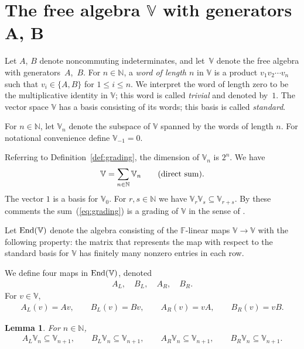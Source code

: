 \documentclass[pdftex]{sigma}
\numberwithin{equation}{section}
\newtheorem{Lemma}[Theorem]{Lemma}
\begin{document}
\section[The free algebra $\mathbb V$ with generators $A$, $B$]{The free algebra $\boldsymbol{\mathbb V}$ with generators $\boldsymbol{A}$, $\boldsymbol{B}$}\label{section3}

Let $A$, $B$ denote noncommuting indeterminates, and let~$\mathbb V$ denote the free algebra
with genera\-tors~$A$,~$B$. For $n \in \mathbb N$, a {\it word of length $n$} in $\mathbb V$
is a product $v_1 v_2 \cdots v_n$ such that $v_i \in \lbrace A, B\rbrace$
for $1 \leq i \leq n$. We interpret the word of length zero
 to be the multiplicative identity in $\mathbb V$; this word is called {\it trivial} and denoted by~$1$.
The vector space $\mathbb V$ has a basis consisting of its words; this basis is called {\it standard}.

\begin{Definition}\label{def:grading}For $n \in \mathbb N$, let ${\mathbb V}_n$ denote the
subspace of $\mathbb V$ spanned by the words of length $n$. For notational convenience define ${\mathbb V}_{-1}=0$.
\end{Definition}

Referring to Definition~\ref{def:grading}, the dimension of ${\mathbb V}_n$ is $2^n$. We have
\begin{gather}\label{eq:grading}
\mathbb V=\sum_{n \in \mathbb N} {\mathbb V}_n \qquad \mbox{\rm (direct sum).}
\end{gather}
The vector $1$ is a basis for ${\mathbb V}_0$.
For $r,s\in \mathbb N$ we have ${\mathbb V}_r {\mathbb V}_s \subseteq
{\mathbb V}_{r+s}$.
By these comments
the sum~(\ref{eq:grading}) is a grading of $\mathbb V$ in the sense of
\cite[p.~704]{rotman}.

Let ${\rm End}(\mathbb V)$ denote the algebra consisting of the
$\mathbb F$-linear maps $\mathbb V \to \mathbb V$
with the following property: the matrix that represents the map
with respect to the standard basis for $\mathbb V$ has
 finitely many nonzero entries in each row.

\begin{Definition}\label{def:ALetc}
We define four maps in ${\rm End}(\mathbb V)$, denoted
\begin{gather}
A_L, \quad
B_L, \quad
A_R, \quad
B_R.
\label{eq:leftmult}
\end{gather}
For $v \in \mathbb V$,
\begin{gather*}
A_L(v)=Av, \qquad
B_L(v)=Bv, \qquad
A_R(v)=vA, \qquad
B_R(v)=vB.%
\end{gather*}
\end{Definition}
\begin{Lemma}\label{lem:ABraise}
For $n \in \mathbb N$,
\begin{gather*}
A_L {\mathbb V}_n \subseteq {\mathbb V}_{n+1}, \qquad
B_L {\mathbb V}_n \subseteq {\mathbb V}_{n+1}, \qquad
A_R {\mathbb V}_n \subseteq {\mathbb V}_{n+1}, \qquad
B_R {\mathbb V}_n \subseteq {\mathbb V}_{n+1}.
\end{gather*}
\end{Lemma}
\end{document}
